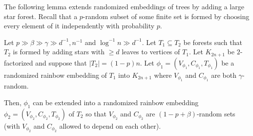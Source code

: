 The following lemma extends randomized embeddings of trees by adding a large star forest. Recall that a 
$p$-random subset of some finite set is formed by choosing every element of it independently 
with probability $p$.
\begin{lemma}\label{Lemma_extending_with_large_stars}
Let $p\gg \beta\gg \gamma \gg d^{-1}, n^{-1}$ and $\log^{-1} n\gg d^{-1}$.
Let $T_1\subseteq T_2$ be forests such that $T_2$ is formed by adding stars with $\geq d$ leaves to vertices of $T_1$. Let  $K_{2n+1}$ be $2$-factorized and suppose that $|T_2|=(1-p)n$.
Let $\phi_1=(V_{\phi_1}, C_{\phi_1}, T_{\phi_1})$ be a randomized rainbow embedding of $T_1$ into $K_{2n+1}$ where $V_{\phi_1}$ and $C_{\phi_1}$ are both $\gamma$-random.

Then, $\phi_1$ can be extended into a randomized rainbow embedding $\phi_2=(V_{\phi_2}, C_{\phi_2}, T_{\phi_2})$ of $T_2$ so that $V_{\phi_2}$ and $C_{\phi_2}$ are $(1-p+\beta)$-random sets (with $V_{\phi_2}$ and $C_{\phi_2}$ allowed to depend on each other).



\end{lemma}
